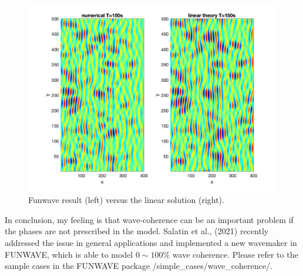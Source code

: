 \documentclass[preprint,10pt]{elsarticle}
\begin{document}
 \begin{figure}
\begin{center}
 \includegraphics[width=1.0\textwidth]{figures/theory_funwave_150.jpg}
 \caption{Funwave result (left) versus the linear solution (right).}
 \label{funwave_theory}
 \end{center}
 \end{figure}
 
 In conclusion, my feeling is that wave-coherence can be an important problem if the phases are not prescribed in the model.   Salatin et al., (2021) recently addressed the issue in general applications and implemented a new wavemaker in FUNWAVE, which is able to model $0 \sim 100\%$ wave coherence. Please refer to the sample cases in the FUNWAVE package /simple\_cases/wave\_coherence/. 
  
  
\end{document}
